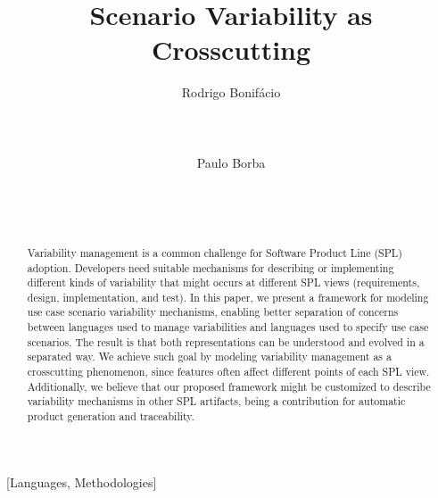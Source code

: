 \documentclass{acm_proc_article-sp}
\begin{document}
\lstset{language=Haskell, numbers=left,
numberstyle=\tiny,numbersep=5pt,basicstyle=\scriptsize,aboveskip=20pt}

\title{Scenario Variability as Crosscutting}



\author{
\alignauthor
Rodrigo Bonif\'{a}cio\\
       \\
       \\
       \\
\alignauthor
Paulo Borba\\
       \\
       \\
       \\
}

\maketitle              

\begin{abstract}
Variability management is a common challenge for Software Product
Line (SPL) adoption. Developers need suitable
mechanisms for describing or implementing different kinds of variability
that might occurs at different SPL views (requirements, design,
implementation, and test). In this paper, we present a framework for
modeling use case scenario variability mechanisms, enabling better
separation of concerns between languages used to manage
variabilities and languages used to specify use case scenarios. The
result is that both representations can be understood and evolved in
a separated way. We achieve such goal by modeling variability management
as a crosscutting phenomenon, since features often affect
different points of each SPL view. Additionally, we believe that our proposed framework might be customized to 
describe variability mechanisms in other SPL artifacts, being a contribution for automatic product generation and traceability.
\end{abstract}

[Languages,
Methodologies]\

\end{document}
